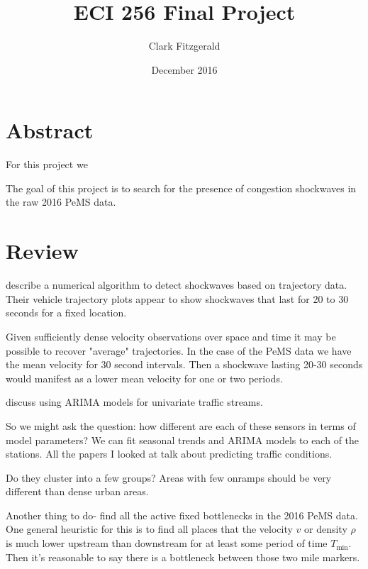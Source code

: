 \documentclass[12pt]{article}
\begin{document}
\title{ECI 256 Final Project}
\date{December 2016}
\author{Clark Fitzgerald}
\maketitle

\section{Abstract}

For this project we 

The goal of this project is to search for the presence of congestion
shockwaves in the raw 2016 PeMS data.

\section{Review}

\cite{lu2007freeway} describe a numerical algorithm to detect shockwaves
based on trajectory data. Their vehicle trajectory plots appear to show
shockwaves that last for 20 to 30 seconds for a fixed location.

Given sufficiently dense velocity observations over space and time it may
be possible to recover "average" trajectories. In the case of the PeMS data
we have the mean velocity for 30 second intervals. Then a shockwave lasting
20-30 seconds would manifest as a lower mean velocity for one or two
periods.

\cite{williams2003modeling} discuss using ARIMA models for univariate
traffic streams.


So we might ask the question: how different are each of these sensors in
terms of model parameters? We can fit seasonal trends and ARIMA
models to each of the stations. All the papers I looked at talk about
predicting traffic conditions.

Do they cluster into a few groups?
Areas with few onramps should be very different than dense urban areas.

Another thing to do- find all the active fixed bottlenecks in the 2016 PeMS data.
One general heuristic for this is to find all places that the velocity $v$ or
density $\rho$ is much lower upstream than downstream for at least some
period of time $T_{\min}$. Then it's reasonable to say there is a
bottleneck between those two mile markers.
\end{document}
